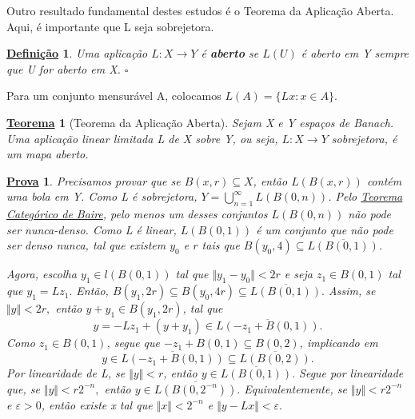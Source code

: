 \documentclass{article}
\newtheorem*{def*}{\underline{Defini\c c\~ao}}
\newtheorem*{theorem*}{\underline{Teorema}}
\newtheorem*{proof*}{\underline{Prova}}
\begin{document}
  Outro resultado fundamental destes estudos é o Teorema da Aplicação Aberta. Aqui, é importante que L seja sobrejetora. 
 \begin{def*}
   Uma aplicação \(L:X\rightarrow Y\) é \textbf{aberto} se \(L(U)\) é aberto em Y sempre que U for aberto em X. \(\square\)
 \end{def*}
 Para um conjunto mensurável A, colocamos \(L(A) = \{Lx: x \in A\}\).
  \hypertarget{open_mapping}{
    \begin{theorem*}[Teorema da Aplicação Aberta]
     Sejam X e Y espaços de Banach. Uma aplicação linear limitada L de X sobre Y, ou seja, \(L:X\rightarrow Y\) sobrejetora, é um mapa aberto.
   \end{theorem*}
  }
 \begin{proof*}
   Precisamos provar que se \(B(x, r)\subseteq X\), então \(L(B(x, r))\) contém uma bola em Y. Como L é sobrejetora, \(Y = \bigcup_{n=1}^{\infty}L(B(0, n))\). Pelo \hyperlink{baire_category}{\textit{Teorema Categórico de Baire}}, 
pelo menos um desses conjuntos \(L(B(0, n))\) não pode ser nunca-denso. Como L é linear, \(L(B(0, 1))\) é um conjunto que não pode ser denso nunca, tal que existem \(y_{0}\) e \(r\) tais que \(B(y_{0}, 4)\subseteq \overline{L(B(0, 1))}\).  

  Agora, escolha \(y_1\in l(B(0, 1))\) tal que \(\Vert y_1 - y_{0} \Vert < 2r\) e seja \(z_1\in B(0, 1)\) tal que \(y_1 = Lz_1.\) Então, \(B(y_1, 2r)\subseteq B(y_{0}, 4r)\subseteq \overline{L(B(0, 1))}.\) Assim, se \(\Vert y \Vert < 2r,\) então 
  \(y + y_1\in B(y_1, 2r)\), tal que 
    \[
      y= -Lz_1 + (y + y_1)\in \overline{L(-z_1 + B(0, 1))}.
    \]
  Como \(z_1\in B(0, 1)\), segue que \(-z_1 + B(0, 1)\subseteq B(0, 2)\), implicando em 
    \[
      y\in \overline{L(-z_1 + B(0, 1))}\subseteq \overline{L(B(0, 2))}.
    \]
  Por linearidade de L, se \(\Vert y \Vert < r\), então \(y\in \overline{L(B(0, 1))}.\) Segue por linearidade que, se \(\Vert y \Vert < r2^{-n},\) então \(y\in \overline{L(B(0, 2^{-n}))}.\) Equivalentemente, 
se \(\Vert y \Vert < r2^{-n}\) e \(\varepsilon  > 0\), então existe x tal que \(\Vert x \Vert < 2^{-n} \) e \(\Vert y - Lx \Vert < \varepsilon .\)


\end{proof*}
\end{document}
